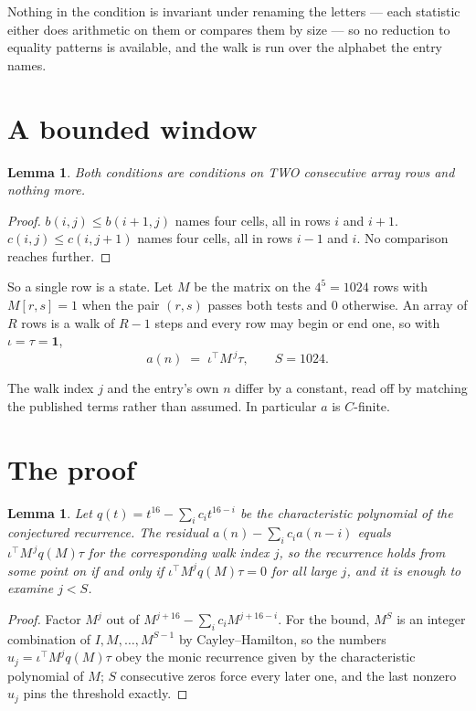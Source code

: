 \documentclass[11pt,a4paper]{article}
\theoremstyle{plain}
\newtheorem{lemma}[theorem]{Lemma}
\theoremstyle{definition}
\begin{document}
Nothing in the condition is invariant under renaming the letters --- each statistic either does
arithmetic on them or compares them by size --- so no reduction to equality patterns is
available, and the walk is run over the alphabet the entry names.

\section{A bounded window}

\begin{lemma}\label{lem:win}
Both conditions are conditions on TWO consecutive array rows and nothing more.
\end{lemma}

\begin{proof}
$b(i,j)\le b(i{+}1,j)$ names four cells, all in rows $i$ and $i+1$. $c(i,j)\le c(i,j{+}1)$
names four cells, all in rows $i-1$ and $i$. No comparison reaches further.
\end{proof}

So a single row is a state. Let $M$ be the matrix on the $4^{5}=1024$ rows with
$M[r,s]=1$ when the pair $(r,s)$ passes both tests and $0$ otherwise. An array of $R$ rows is a
walk of $R-1$ steps and every row may begin or end one, so with $\iota=\tau=\mathbf{1}$,
\[
a(n)\;=\;\iota^{\!\top}M^{\,j}\tau ,\qquad S=1024.
\]

The walk index $j$ and the entry's own $n$ differ by a constant, read off by matching the
published terms rather than assumed. In particular $a$ is $C$-finite.

\section{The proof}

\begin{lemma}\label{lem:crit}
Let $q(t)=t^{16}-\sum_i c_it^{16-i}$ be the characteristic polynomial of the
conjectured recurrence. The residual $a(n)-\sum_ic_ia(n-i)$ equals
$\iota^{\!\top}M^{\,j}q(M)\tau$ for the corresponding walk index $j$, so the recurrence
holds from some point on if and only if $\iota^{\!\top}M^{j}q(M)\tau=0$ for all large $j$,
and it is enough to examine $j<S$.
\end{lemma}

\begin{proof}
Factor $M^{j}$ out of $M^{j+16}-\sum_ic_iM^{j+16-i}$. For the bound, $M^{S}$
is an integer combination of $I,M,\dots,M^{S-1}$ by Cayley--Hamilton, so the numbers
$u_j=\iota^{\!\top}M^{j}q(M)\tau$ obey the monic recurrence given by the characteristic
polynomial of $M$; $S$ consecutive zeros force every later one, and the last nonzero $u_j$
pins the threshold exactly.
\end{proof}
\end{document}
